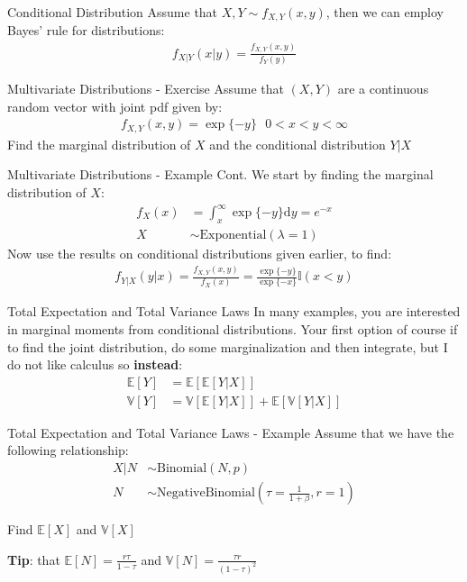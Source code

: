 \documentclass{beamer}
\begin{document}
\begin{frame}{Conditional Distribution}
Assume that $X, Y \sim f_{X,Y}(x, y)$, then we can employ Bayes' rule for distributions:
\begin{align*}
f_{X|Y}(x|y) = \frac{f_{X, Y}(x, y)}{f_{Y}(y)}
\end{align*}
\end{frame}

\begin{frame}{Multivariate Distributions - Exercise}
Assume that $(X, Y)$ are a continuous random vector with joint pdf given by:
\begin{align*}
f_{X, Y}(x, y) = \exp\{-y\}\>\>\> 0<x<y<\infty
\end{align*}
Find the marginal distribution of $X$ and the conditional distribution $Y|X$
\end{frame}



\begin{frame}{Multivariate Distributions - Example Cont.}
We start by finding the marginal distribution of $X$:
\begin{align*}
f_{X}(x) &= \int_{x}^{\infty} \exp\{ -y \}\mathrm{d}y = e^{-x} \\
X&\sim\mathrm{Exponential}(\lambda = 1)
\end{align*}
Now use the results on conditional distributions given earlier, to find:
\begin{align*}
f_{Y|X}(y|x) =  \frac{f_{X, Y}(x, y)}{f_{X}(x)} = \frac{\exp\{ -y\}}{\exp{\{ -x\}}} \mathbb{I}(x<y)
\end{align*}
\end{frame}

\begin{frame}{Total Expectation and Total Variance Laws}
In many examples, you are interested in marginal moments from conditional distributions. Your first option of course if to find the joint distribution, do some marginalization and then integrate, but I do not like calculus so \textbf{instead}:
\begin{align*}
\mathbb{E}[Y] &= \mathbb{E}[\mathbb{E}[Y|X]] \\
\mathbb{V}[Y] &= \mathbb{V}[\mathbb{E}[Y|X]] + \mathbb{E}[\mathbb{V}[Y|X]]
\end{align*}
\end{frame}

\begin{frame}{Total Expectation and Total Variance Laws - Example}
Assume that we have the following relationship:
\begin{align*}
X|N &\sim \mathrm{Binomial}(N, p) \\
N &\sim\mathrm{Negative Binomial}(\tau = \frac{1}{1+\beta}, r = 1)
\end{align*}
\newline

Find $\mathbb{E}[X]$ and $\mathbb{V}[X]$
\newline

\textbf{Tip}: that $\mathbb{E}[N] = \frac{r\tau}{1-\tau}$ and $\mathbb{V}[N] = \frac{\tau r}{(1-\tau)^{2}} $
\end{frame}
\end{document}
